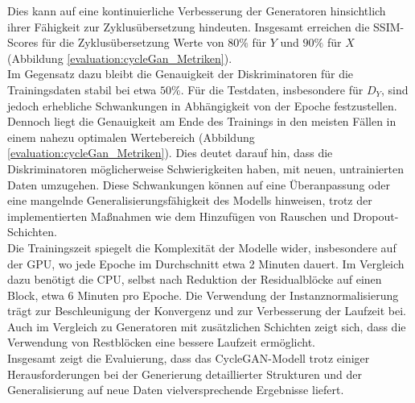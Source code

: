 Dies kann auf eine kontinuierliche Verbesserung der Generatoren hinsichtlich ihrer Fähigkeit zur Zyklusübersetzung hindeuten. Insgesamt erreichen die SSIM-Scores für die Zyklusübersetzung Werte von $80\%$ für $Y$ und $90\%$ für $X$ (Abbildung \ref{evaluation:cycleGan_Metriken}).\\

Im Gegensatz dazu bleibt die Genauigkeit der Diskriminatoren für die Trainingsdaten stabil bei etwa $50\%$. Für die Testdaten, insbesondere für $D_Y$, sind jedoch erhebliche Schwankungen in Abhängigkeit von der Epoche festzustellen. Dennoch liegt die Genauigkeit am Ende des Trainings in den meisten Fällen in einem nahezu optimalen Wertebereich (Abbildung \ref{evaluation:cycleGan_Metriken}). Dies deutet darauf hin, dass die Diskriminatoren möglicherweise Schwierigkeiten haben, mit neuen, untrainierten Daten umzugehen. Diese Schwankungen können auf eine Überanpassung oder eine mangelnde Generalisierungsfähigkeit des Modells hinweisen, trotz der implementierten Maßnahmen wie dem Hinzufügen von Rauschen und Dropout-Schichten.\\\newline
Die Trainingszeit spiegelt die Komplexität der Modelle wider, insbesondere auf der GPU, wo jede Epoche im Durchschnitt etwa 2 Minuten dauert. Im Vergleich dazu benötigt die CPU, selbst nach Reduktion der Residualblöcke auf einen Block, etwa 6 Minuten pro Epoche. Die Verwendung der Instanznormalisierung trägt zur Beschleunigung der Konvergenz und zur Verbesserung der Laufzeit bei. Auch im Vergleich zu Generatoren mit zusätzlichen Schichten zeigt sich, dass die Verwendung von Restblöcken eine bessere Laufzeit ermöglicht. 
\\\newline
Insgesamt zeigt die Evaluierung, dass das CycleGAN-Modell trotz einiger Herausforderungen bei der Generierung detaillierter Strukturen und der Generalisierung auf neue Daten vielversprechende Ergebnisse liefert.